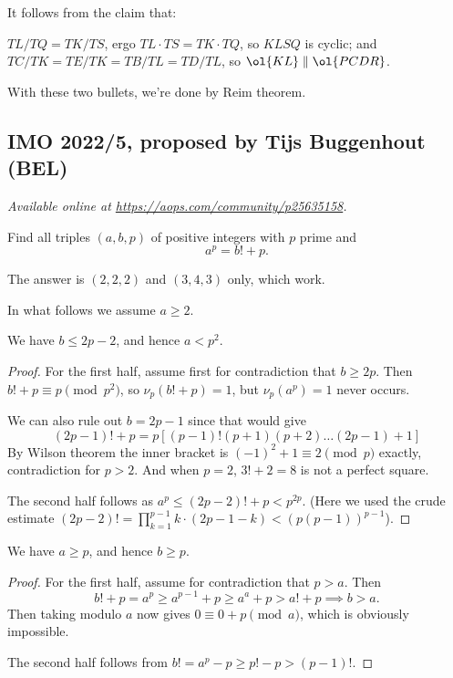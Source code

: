\documentclass[11pt]{scrartcl}
\begin{document}
It follows from the claim that:
\begin{itemize}
  \ii $TL/TQ = TK/TS$, ergo $TL \cdot TS = TK \cdot TQ$,
  so $KLSQ$ is cyclic; and
  \ii $TC/TK = TE/TK = TB/TL = TD/TL$, so $\ol{KL} \parallel \ol{PCDR}$.
\end{itemize}
With these two bullets, we're done by Reim theorem.
\pagebreak

\subsection{IMO 2022/5, proposed by Tijs Buggenhout (BEL)}
\textsl{Available online at \url{https://aops.com/community/p25635158}.}
\begin{mdframed}[style=mdpurplebox,frametitle={Problem statement}]
Find all triples $(a,b,p)$ of positive integers with $p$ prime and
\[ a^p=b!+p. \]
\end{mdframed}
The answer is $(2,2,2)$ and $(3,4,3)$ only, which work.

In what follows we assume $a \ge 2$.

\begin{claim*}
  We have $b \le 2p-2$, and hence $a < p^2$.
\end{claim*}
\begin{proof}
  For the first half, assume first for contradiction that $b \ge 2p$.
  Then $b!+p \equiv p \pmod{p^2}$, so $\nu_p(b!+p)=1$,
  but $\nu_p(a^p)=1$ never occurs.

  We can also rule out $b = 2p-1$ since that would give
  \[ (2p-1)!+p = p \left[ (p-1)! (p+1)(p+2)\dots(2p-1) + 1 \right] \]
  By Wilson theorem the inner bracket is $(-1)^2+1 \equiv 2 \pmod p$
  exactly, contradiction for $p > 2$.
  And when $p=2$, $3!+2=8$ is not a perfect square.

  The second half follows as $a^p \le (2p-2)!+p < p^{2p}$.
  (Here we used the crude estimate
  $(2p-2)! = \prod_{k=1}^{p-1}k \cdot (2p-1-k) < (p(p-1))^{p-1}$).
\end{proof}

\begin{claim*}
  We have $a \ge p$, and hence $b \ge p$.
\end{claim*}
\begin{proof}
  For the first half, assume for contradiction that $p > a$.
  Then
  \[ b! + p = a^p \ge a^{p-1} + p \ge a^a + p > a! + p \implies b > a. \]
  Then taking modulo $a$ now gives $0 \equiv 0 + p \pmod{a}$,
  which is obviously impossible.

  The second half follows from $b! = a^p-p \ge p! - p > (p-1)!$.
\end{proof}
\end{document}
